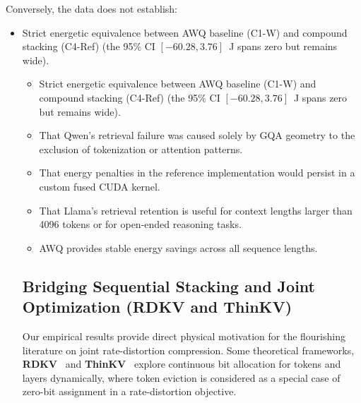 \documentclass[sigconf,nonacm]{acmart}
\begin{document}
Conversely, the data does not establish:
\begin{itemize}\raggedright
  \item Strict energetic equivalence between AWQ baseline (C1-W) and compound stacking (C4-Ref) (the 95\% CI $[-60.28, 3.76]$~J spans zero but remains wide).
\begin{itemize}\raggedright
  \item Strict energetic equivalence between AWQ baseline (C1-W) and compound stacking (C4-Ref) (the 95\% CI $[-60.28, 3.76]$~J spans zero but remains wide).
  \item That Qwen's retrieval failure was caused solely by GQA geometry to the exclusion of tokenization or attention patterns.
  \item That energy penalties in the reference implementation would persist in a custom fused CUDA kernel.
  \item That Llama's retrieval retention is useful for context lengths larger than 4096 tokens or for open-ended reasoning tasks.
  \item AWQ provides stable energy savings across all sequence lengths.
\end{itemize}

\subsection{Bridging Sequential Stacking and Joint Optimization (RDKV and ThinKV)}
\label{sec:joint-opt}

Our empirical results provide direct physical motivation for the flourishing literature on joint rate-distortion compression. Some theoretical frameworks, \textbf{RDKV}~\cite{zhang_rdkv_2026} and \textbf{ThinKV}~\cite{ramachandran_thinkv_2026} explore continuous bit allocation for tokens and layers dynamically, where token eviction is considered as a special case of zero-bit assignment in a rate-distortion objective.


\end{itemize}
\end{document}
